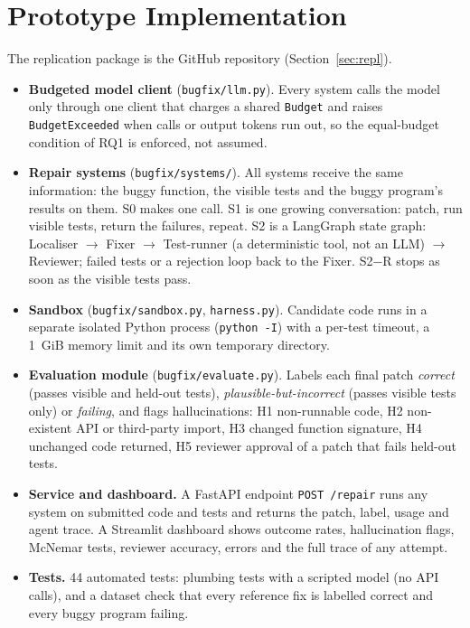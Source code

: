 \documentclass[conference]{IEEEtran}
\begin{document}
\section{Prototype Implementation}
The replication package is the GitHub repository (Section~\ref{sec:repl}).
\begin{itemize}
\item \textbf{Budgeted model client} (\texttt{bugfix/llm.py}). Every system
calls the model only through one client that charges a shared \texttt{Budget}
and raises \texttt{BudgetExceeded} when calls or output tokens run out, so the
equal-budget condition of RQ1 is enforced, not assumed.
\item \textbf{Repair systems} (\texttt{bugfix/systems/}). All systems receive
the same information: the buggy function, the visible tests and the buggy
program's results on them. S0 makes one call. S1 is one growing conversation:
patch, run visible tests, return the failures, repeat. S2 is a LangGraph state
graph: Localiser $\rightarrow$ Fixer $\rightarrow$ Test-runner (a deterministic
tool, not an LLM) $\rightarrow$ Reviewer; failed tests or a rejection loop back
to the Fixer. S2$-$R stops as soon as the visible tests pass.
\item \textbf{Sandbox} (\texttt{bugfix/sandbox.py}, \texttt{harness.py}).
Candidate code runs in a separate isolated Python process (\texttt{python -I})
with a per-test timeout, a 1~GiB memory limit and its own temporary directory.
\item \textbf{Evaluation module} (\texttt{bugfix/evaluate.py}). Labels each
final patch \emph{correct} (passes visible and held-out tests),
\emph{plausible-but-incorrect} (passes visible tests only) or \emph{failing},
and flags hallucinations: H1 non-runnable code, H2 non-existent API or
third-party import, H3 changed function signature, H4 unchanged code returned,
H5 reviewer approval of a patch that fails held-out tests.
\item \textbf{Service and dashboard.} A FastAPI endpoint \texttt{POST /repair}
runs any system on submitted code and tests and returns the patch, label,
usage and agent trace. A Streamlit dashboard shows outcome rates,
hallucination flags, McNemar tests, reviewer accuracy, errors and the full
trace of any attempt.
\item \textbf{Tests.} 44 automated tests: plumbing tests with a scripted model
(no API calls), and a dataset check that every reference fix is labelled
correct and every buggy program failing.
\end{itemize}
\end{document}
